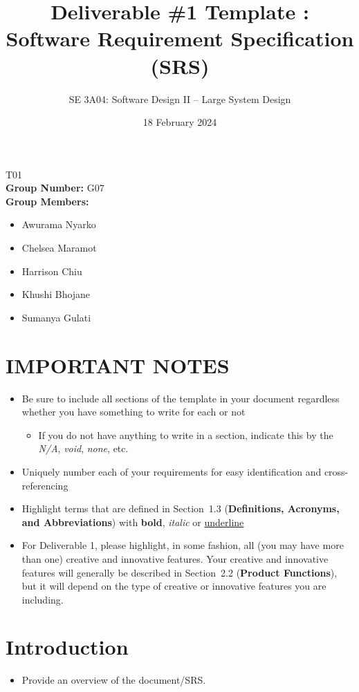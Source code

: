 \documentclass[]{article}
\title{Deliverable \#1 Template : Software Requirement Specification (SRS)}
\author{SE 3A04: Software Design II -- Large System Design}
\date{18 February 2024}
\begin{document}
\maketitle	
{} T01\\
{\bf Group Number:} G07 \\
{\bf Group Members:} 
\begin{itemize}
	\item Awurama Nyarko
	\item Chelsea Maramot
 	\item Harrison Chiu
  	\item Khushi Bhojane
   	\item Sumanya Gulati
\end{itemize}

\section*{IMPORTANT NOTES}
\begin{itemize}
	\item Be sure to include all sections of the template in your document regardless whether you have something to write for each or not
	\begin{itemize}
		\item If you do not have anything to write in a section, indicate this by the \emph{N/A}, \emph{void}, \emph{none}, etc.
	\end{itemize}
	\item Uniquely number each of your requirements for easy identification and cross-referencing
	\item Highlight terms that are defined in Section~1.3 (\textbf{Definitions, Acronyms, and Abbreviations}) with \textbf{bold}, \emph{italic} or \underline{underline}
	\item For Deliverable 1, please highlight, in some fashion, all (you may have more than one) creative and innovative features. Your creative and innovative features will generally be described in Section~2.2 (\textbf{Product Functions}), but it will depend on the type of creative or innovative features you are including.
\end{itemize}

\newpage
\section{Introduction}
\label{sec:introduction}

\begin{itemize}
	\item Provide an overview of the document/SRS.
\end{itemize}
\end{document}
